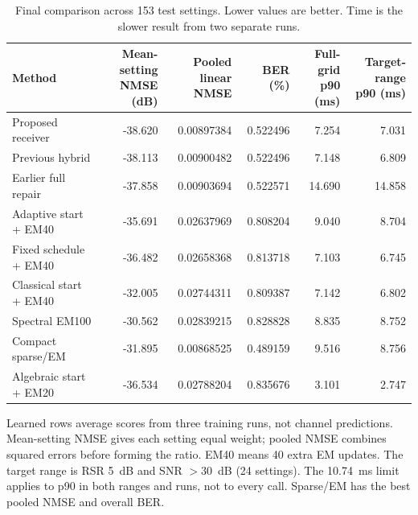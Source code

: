 \begin{table}[!t]
\centering
\caption{Final comparison across 153 test settings. Lower values are better. Time is the slower result from two separate runs.}
\label{tab:reliability-main}
\small
\setlength{\tabcolsep}{4pt}
\begin{tabular}{lrrrrr}
\toprule
Method & \shortstack{Mean-setting\\NMSE (dB)} & \shortstack{Pooled linear\\NMSE} & BER (\%) & \shortstack{Full-grid\\p90 (ms)} & \shortstack{Target-range\\p90 (ms)} \\
\midrule
Proposed receiver & -38.620 & 0.00897384 & 0.522496 & 7.254 & 7.031 \\
Previous hybrid & -38.113 & 0.00900482 & 0.522496 & 7.148 & 6.809 \\
Earlier full repair & -37.858 & 0.00903694 & 0.522571 & 14.690 & 14.858 \\
Adaptive start + EM40 & -35.691 & 0.02637969 & 0.808204 & 9.040 & 8.704 \\
Fixed schedule + EM40 & -36.482 & 0.02658368 & 0.813718 & 7.103 & 6.745 \\
Classical start + EM40 & -32.005 & 0.02744311 & 0.809387 & 7.142 & 6.802 \\
Spectral EM100 & -30.562 & 0.02839215 & 0.828828 & 8.835 & 8.752 \\
Compact sparse/EM & -31.895 & 0.00868525 & 0.489159 & 9.516 & 8.756 \\
Algebraic start + EM20 & -36.534 & 0.02788204 & 0.835676 & 3.101 & 2.747 \\
\bottomrule
\end{tabular}
\par\vspace{2pt}
\begin{minipage}{0.98\textwidth}\footnotesize Learned rows average scores from three training runs, not channel predictions. Mean-setting NMSE gives each setting equal weight; pooled NMSE combines squared errors before forming the ratio. EM40 means 40 extra EM updates. The target range is RSR 5~dB and SNR $>30$~dB (24 settings). The 10.74~ms limit applies to p90 in both ranges and runs, not to every call. Sparse/EM has the best pooled NMSE and overall BER.\end{minipage}
\end{table}
